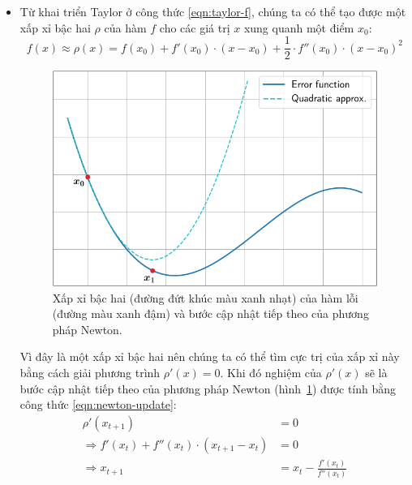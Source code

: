 \begin{itemize}
	\item Từ khai triển Taylor ở công thức \ref{eqn:taylor-f}, chúng ta có thể tạo được một xấp xỉ bậc hai $\rho$ của hàm $f$ cho các giá trị $x$ xung quanh một điểm $x_0$:
	\begin{equation}
		\label{eqn:quad-approx}
		f(x) \approx \rho(x) = f(x_0) + f'(x_0) \cdot (x - x_0) + \frac{1}{2} \cdot f''(x_0) \cdot (x - x_0)^2
	\end{equation}
	\begin{figure}[H]
		\centering
		\includegraphics[width=120 mm]{images/quad-approx.png}
		\caption{Xấp xỉ bậc hai (đường đứt khúc màu xanh nhạt) của hàm lỗi (đường màu xanh đậm) và bước cập nhật tiếp theo của phương pháp Newton.}
		\label{fig:newton-step}
	\end{figure}
	Vì đây là một xấp xỉ bậc hai nên chúng ta có thể tìm cực trị của xấp xỉ này bằng cách giải phương trình $\rho '(x) = 0$. Khi đó nghiệm của $\rho'(x)$ sẽ là bước cập nhật tiếp theo của phương pháp Newton (hình~\ref{fig:newton-step}) được tính bằng công thức \ref{eqn:newton-update}:
	\begin{equation} \label{eqn:newton-update}
		\begin{aligned}
			\rho'(x_{t+1}) &= 0 \\
			\Rightarrow f'(x_t) + f''(x_t) \cdot (x_{t+1} - x_t) &= 0 \\
			\Rightarrow x_{t+1} &= x_t - \frac{f'(x_t)}{f''(x_t)}
		\end{aligned}
	\end{equation}


\end{itemize}
